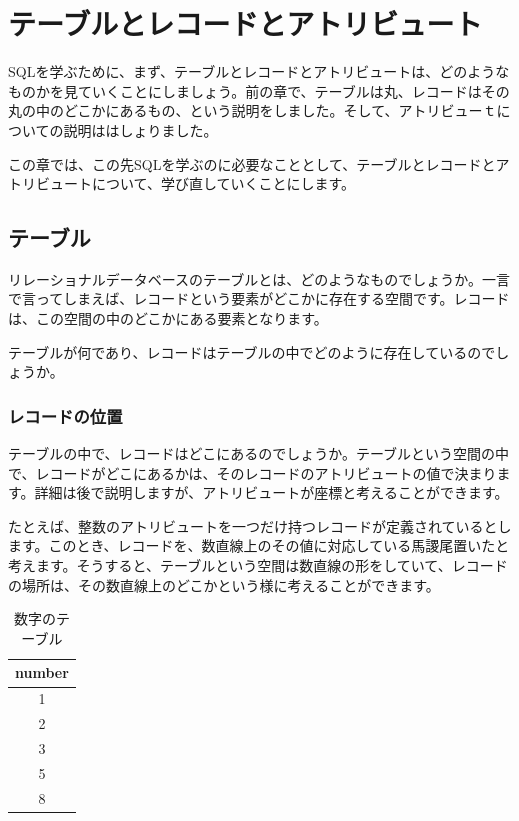 \chapter{テーブルとレコードとアトリビュート}

SQLを学ぶために、まず、テーブルとレコードとアトリビュートは、どのようなものかを見ていくことにしましょう。前の章で、テーブルは丸、レコードはその丸の中のどこかにあるもの、という説明をしました。そして、アトリビューｔについての説明ははしょりました。

この章では、この先SQLを学ぶのに必要なこととして、テーブルとレコードとアトリビュートについて、学び直していくことにします。


\section{テーブル}

リレーショナルデータベースのテーブルとは、どのようなものでしょうか。一言で言ってしまえば、レコードという要素がどこかに存在する空間です。レコードは、この空間の中のどこかにある要素となります。

テーブルが何であり、レコードはテーブルの中でどのように存在しているのでしょうか。

\subsection{レコードの位置}

テーブルの中で、レコードはどこにあるのでしょうか。テーブルという空間の中で、レコードがどこにあるかは、そのレコードのアトリビュートの値で決まります。詳細は後で説明しますが、アトリビュートが座標と考えることができます。

たとえば、整数のアトリビュートを一つだけ持つレコードが定義されているとします。このとき、レコードを、数直線上のその値に対応している馬謖尾置いたと考えます。そうすると、テーブルという空間は数直線の形をしていて、レコードの場所は、その数直線上のどこかという様に考えることができます。

\begin{table}[htb]
  \begin{tabular}{|c|} \hline
    number \\ \hline
    1 \\
    2 \\
    3 \\
    5 \\ 
    8 \\ \hline
  \end{tabular}
　　\label{table:number}
　　\caption{数字のテーブル}
\end{table}

